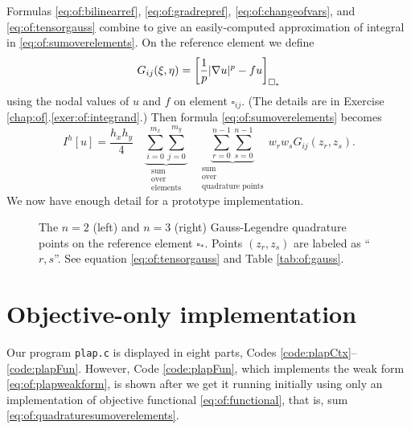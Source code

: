 Formulas \eqref{eq:of:bilinearref}, \eqref{eq:of:gradrepref}, \eqref{eq:of:changeofvars}, and \eqref{eq:of:tensorgauss} combine to give an easily-computed approximation of integral in \eqref{eq:of:sumoverelements}.  On the reference element we define
\begin{equation}
G_{ij}(\xi,\eta) = \left[\frac{1}{p} |\nabla u|^p - fu\right]_{\square_\ast} \label{eq:of:integrandheuristic}
\end{equation}
using the nodal values of $u$ and $f$ on element $\square_{ij}$.  (The details are in Exercise \ref{chap:of}.\ref{exer:of:integrand}.)  Then formula \eqref{eq:of:sumoverelements} becomes
\begin{equation}
I^h[u] = \frac{h_x h_y}{4} \quad \underbrace{\sum_{i=0}^{m_x} \sum_{j=0}^{m_y}}_{\begin{smallmatrix} \text{sum} \\ \text{over} \\ \text{elements} \end{smallmatrix}} \quad \underbrace{\sum_{r=0}^{n-1} \sum_{s=0}^{n-1}}_{\begin{smallmatrix} \text{sum} \\ \text{over} \\ \text{quadrature points} \end{smallmatrix}} \, w_r w_s G_{ij}(z_r,z_s). \label{eq:of:quadraturesumoverelements}
\end{equation}
We now have enough detail for a prototype implementation.

\begin{figure}

\caption{The $n=2$ (left) and $n=3$ (right) Gauss-Legendre quadrature points on the reference element $\square_\ast$.  Points $(z_r,z_s)$ are labeled as ``$r,s$''.  See equation \eqref{eq:of:tensorgauss} and Table \ref{tab:of:gauss}.}
\label{fig:of:gausstwod}
\end{figure}


\section{Objective-only implementation}

Our program \texttt{plap.c} is displayed in eight parts, Codes \ref{code:plapCtx}--\ref{code:plapFun}.  However, Code \ref{code:plapFun}, which implements the weak form \eqref{eq:of:plapweakform}, is shown after we get it running initially using only an implementation of objective functional \eqref{eq:of:functional}, that is, sum \eqref{eq:of:quadraturesumoverelements}.

